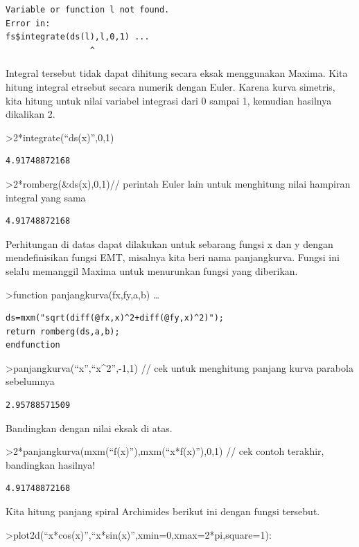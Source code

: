 \documentclass[
]{book}
\begin{document}
\begin{verbatim}
Variable or function l not found.
Error in:
fs$integrate(ds(l),l,0,1) ...
                 ^
\end{verbatim}

Integral tersebut tidak dapat dihitung secara eksak menggunakan Maxima. Kita hitung integral etrsebut secara numerik dengan Euler. Karena kurva simetris, kita hitung untuk nilai variabel integrasi dari 0 sampai 1, kemudian hasilnya dikalikan 2.

\textgreater2*integrate(``ds(x)'',0,1)

\begin{verbatim}
4.91748872168
\end{verbatim}

\textgreater2*romberg(\&ds(x),0,1)// perintah Euler lain untuk menghitung nilai hampiran integral yang sama

\begin{verbatim}
4.91748872168
\end{verbatim}

Perhitungan di datas dapat dilakukan untuk sebarang fungsi x dan y dengan mendefinisikan fungsi EMT, misalnya kita beri nama panjangkurva. Fungsi ini selalu memanggil Maxima untuk menurunkan fungsi yang diberikan.

\textgreater function panjangkurva(fx,fy,a,b) \ldots{}

\begin{verbatim}
ds=mxm("sqrt(diff(@fx,x)^2+diff(@fy,x)^2)");
return romberg(ds,a,b);
endfunction
\end{verbatim}

\textgreater panjangkurva(``x'',``x\^{}2'',-1,1) // cek untuk menghitung panjang kurva parabola sebelumnya

\begin{verbatim}
2.95788571509
\end{verbatim}

Bandingkan dengan nilai eksak di atas.

\textgreater2*panjangkurva(mxm(``f(x)''),mxm(``x*f(x)''),0,1) // cek contoh terakhir, bandingkan hasilnya!

\begin{verbatim}
4.91748872168
\end{verbatim}

Kita hitung panjang spiral Archimides berikut ini dengan fungsi tersebut.

\textgreater plot2d(``x*cos(x)'',``x*sin(x)'',xmin=0,xmax=2*pi,square=1):
\end{document}
